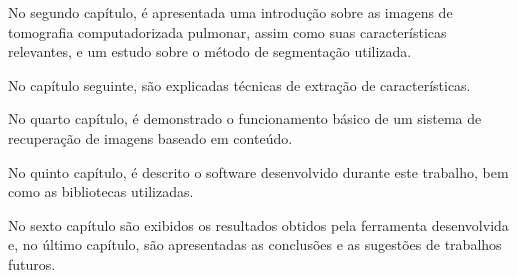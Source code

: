 No segundo capítulo, é apresentada uma introdução sobre as imagens de tomografia computadorizada pulmonar, assim como suas características relevantes, e um estudo sobre o método de segmentação utilizada.

No capítulo seguinte, são explicadas técnicas de extração de características.

No quarto capítulo, é demonstrado o funcionamento básico de um sistema de recuperação de imagens baseado em conteúdo.

No quinto capítulo, é descrito o software desenvolvido durante este trabalho, bem como as bibliotecas utilizadas.

No sexto capítulo são exibidos os resultados obtidos pela ferramenta desenvolvida e, no último capítulo, são apresentadas as conclusões e as sugestões de trabalhos futuros.